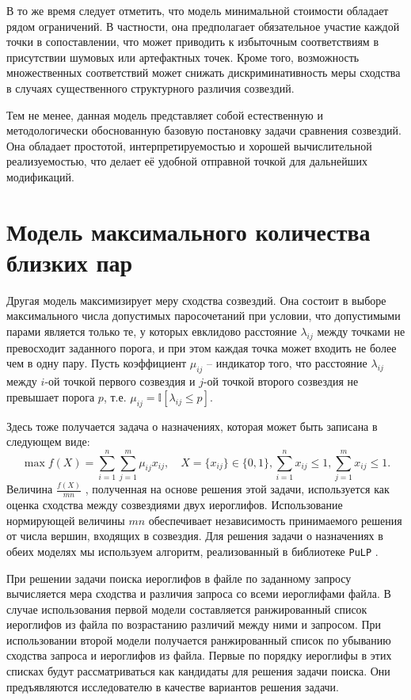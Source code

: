 В то же время следует отметить, что модель минимальной стоимости обладает рядом ограничений. В частности, она предполагает обязательное участие каждой точки в сопоставлении, что может приводить к избыточным соответствиям в присутствии шумовых или артефактных точек. Кроме того, возможность множественных соответствий может снижать дискриминативность меры сходства в случаях существенного структурного различия созвездий.

Тем не менее, данная модель представляет собой естественную и методологически обоснованную базовую постановку задачи сравнения созвездий. Она обладает простотой, интерпретируемостью и хорошей вычислительной реализуемостью, что делает её удобной отправной точкой для дальнейших модификаций.

\section{Модель максимального количества близких пар}\label{sec:ch4/sec3}
Другая модель максимизирует меру сходства созвездий. Она состоит в выборе максимального числа допустимых паросочетаний при условии, что допустимыми парами является только те, у которых евклидово расстояние $\lambda_{ij}$ между точками не превосходит заданного порога, и при этом каждая точка может входить не более чем в одну пару. Пусть коэффициент $\mu_{ij}$ – индикатор того, что расстояние $\lambda_{ij}$ между $i$-ой точкой первого созвездия и $j$-ой точкой второго созвездия не превышает порога $p$, т.е. $\mu_{ij}=\mathbb{I}[\lambda_{ij}\le p]$.

Здесь тоже получается задача о назначениях, которая может быть записана в следующем виде:
\[
    \max f(X) = \sum_{i=1}^{n}\sum_{j=1}^{m}\mu_{ij}x_{ij}, \quad X =\{x_{ij}\} \in \{0,1\}, \sum_{i=1}^{n}x_{ij}\le 1, \sum_{j=1}^{m}x_{ij}\le 1.
\]
Величина $\frac{f(X)}{mn}$ , полученная на основе решения этой задачи, используется как оценка сходства между созвездиями двух иероглифов. Использование нормирующей величины $mn$ обеспечивает независимость принимаемого решения от числа вершин, входящих в созвездия. Для решения задачи о назначениях в обеих моделях мы используем алгоритм, реализованный в библиотеке \verb|PuLP| \cite{mitchell2011pulp}.

При решении задачи поиска иероглифов в файле по заданному запросу вычисляется мера сходства и различия запроса со всеми иероглифами файла. В случае использования первой модели составляется ранжированный список иероглифов из файла по возрастанию различий между ними и запросом. При использовании второй модели получается ранжированный список по убыванию сходства запроса и иероглифов из файла. Первые по порядку иероглифы в этих списках будут рассматриваться как кандидаты для решения задачи поиска. Они предъявляются исследователю в качестве вариантов решения задачи.

